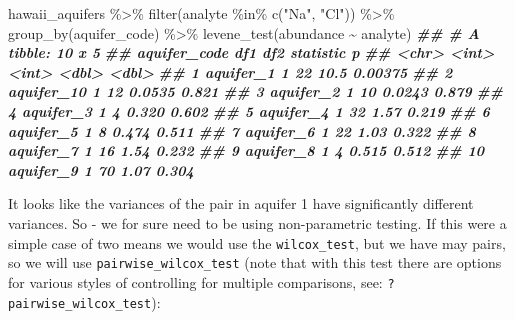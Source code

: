 \documentclass[
]{krantz}
\newenvironment{Shaded}{\begin{snugshade}}{\end{snugshade}}
\newcommand{\DocumentationTok}[1]{\textcolor[rgb]{0.56,0.35,0.01}{\textbf{\textit{#1}}}}
\newcommand{\FunctionTok}[1]{\textcolor[rgb]{0.00,0.00,0.00}{#1}}
\newcommand{\NormalTok}[1]{#1}
\newcommand{\SpecialCharTok}[1]{\textcolor[rgb]{0.00,0.00,0.00}{#1}}
\newcommand{\StringTok}[1]{\textcolor[rgb]{0.31,0.60,0.02}{#1}}
\begin{document}
\begin{Shaded}
\begin{Highlighting}[]
\NormalTok{hawaii\_aquifers }\SpecialCharTok{\%\textgreater{}\%}
  \FunctionTok{filter}\NormalTok{(analyte }\SpecialCharTok{\%in\%} \FunctionTok{c}\NormalTok{(}\StringTok{"Na"}\NormalTok{, }\StringTok{"Cl"}\NormalTok{)) }\SpecialCharTok{\%\textgreater{}\%}
  \FunctionTok{group\_by}\NormalTok{(aquifer\_code) }\SpecialCharTok{\%\textgreater{}\%}
  \FunctionTok{levene\_test}\NormalTok{(abundance }\SpecialCharTok{\textasciitilde{}}\NormalTok{ analyte)}
\DocumentationTok{\#\# \# A tibble: 10 x 5}
\DocumentationTok{\#\#    aquifer\_code   df1   df2 statistic       p}
\DocumentationTok{\#\#    \textless{}chr\textgreater{}        \textless{}int\textgreater{} \textless{}int\textgreater{}     \textless{}dbl\textgreater{}   \textless{}dbl\textgreater{}}
\DocumentationTok{\#\#  1 aquifer\_1        1    22   10.5    0.00375}
\DocumentationTok{\#\#  2 aquifer\_10       1    12    0.0535 0.821  }
\DocumentationTok{\#\#  3 aquifer\_2        1    10    0.0243 0.879  }
\DocumentationTok{\#\#  4 aquifer\_3        1     4    0.320  0.602  }
\DocumentationTok{\#\#  5 aquifer\_4        1    32    1.57   0.219  }
\DocumentationTok{\#\#  6 aquifer\_5        1     8    0.474  0.511  }
\DocumentationTok{\#\#  7 aquifer\_6        1    22    1.03   0.322  }
\DocumentationTok{\#\#  8 aquifer\_7        1    16    1.54   0.232  }
\DocumentationTok{\#\#  9 aquifer\_8        1     4    0.515  0.512  }
\DocumentationTok{\#\# 10 aquifer\_9        1    70    1.07   0.304}
\end{Highlighting}
\end{Shaded}

It looks like the variances of the pair in aquifer 1 have significantly different variances. So - we for sure need to be using non-parametric testing. If this were a simple case of two means we would use the \texttt{wilcox\_test}, but we have may pairs, so we will use \texttt{pairwise\_wilcox\_test} (note that with this test there are options for various styles of controlling for multiple comparisons, see: \texttt{?pairwise\_wilcox\_test}):
\end{document}
